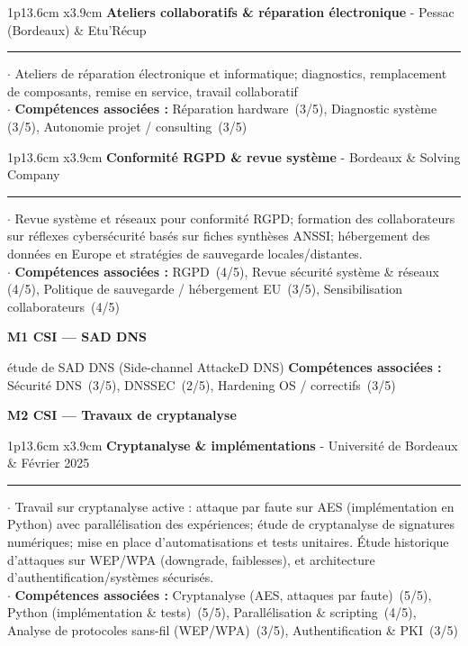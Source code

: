 \documentclass[10pt,a4paper]{article}
\newcommand{\score}[1]{\,(#1/5)}
\newcommand{\cvsection}[1]{\begin{center}\large\textcolor{sectcol}{\textbf{#1}}\end{center}}
\newcommand{\cvevent}[5]{%
\begin{tabular*}{1\textwidth}{p{13.6cm}  x{3.9cm}}
	\textbf{#2} - \textcolor{bgcol}{#3} &   \vspace{2.5pt}\textcolor{sectcol}{#1}
\end{tabular*}
\vspace{-8pt}
\textcolor{softcol}{\hrule}
\vspace{6pt}
  $\cdot$ #4\\[3pt]
  $\cdot$ #5\\[6pt]
}
\begin{document}
\cvevent{Etu'Récup}{Ateliers collaboratifs \& réparation électronique}{Pessac (Bordeaux)}{Ateliers de réparation électronique et informatique; diagnostics, remplacement de composants, remise en service, travail collaboratif}{\textbf{Compétences associées :} Réparation hardware \score{3}, Diagnostic système \score{3}, Autonomie projet / consulting \score{3}}

\cvevent{Solving Company}{Conformité RGPD \& revue système}{Bordeaux}{Revue système et réseaux pour conformité RGPD; formation des collaborateurs sur réflexes cybersécurité basés sur fiches synthèses ANSSI; hébergement des données en Europe et stratégies de sauvegarde locales/distantes.}{\textbf{Compétences associées :} RGPD \score{4}, Revue sécurité système \& réseaux \score{4}, Politique de sauvegarde / hébergement EU \score{3}, Sensibilisation collaborateurs \score{4}}

\pagebreak

\cvsection{M1 CSI --- SAD DNS}
\noindent étude de SAD DNS (Side-channel AttackeD DNS)
\noindent\textbf{Compétences associées :} Sécurité DNS \score{3}, DNSSEC \score{2}, Hardening OS / correctifs \score{3}

\cvsection{M2 CSI --- Travaux de cryptanalyse}
\cvevent{Février 2025}{Cryptanalyse \& implémentations}{Université de Bordeaux}{Travail sur cryptanalyse active : attaque par faute sur AES (implémentation en Python) avec parallélisation des expériences; étude de cryptanalyse de signatures numériques; mise en place d'automatisations et tests unitaires. Étude historique d'attaques sur WEP/WPA (downgrade, faiblesses), et architecture d'authentification/systèmes sécurisés.}{\textbf{Compétences associées :} Cryptanalyse (AES, attaques par faute) \score{5}, Python (implémentation \& tests) \score{5}, Parallélisation \& scripting \score{4}, Analyse de protocoles sans-fil (WEP/WPA) \score{3}, Authentification \& PKI \score{3}}
\end{document}
